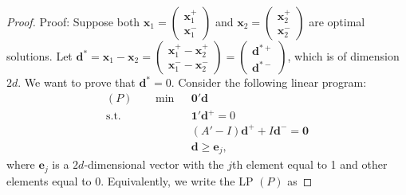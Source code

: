 \documentclass[final,11pt,3p]{article}\usepackage{setspace}
\begin{document}
\begin{proof}{Proof:}
Suppose both $\boldsymbol{x}_1=\begin{pmatrix}\boldsymbol{x}_1^+\\\boldsymbol{x}_1^-\end{pmatrix}$ and $\boldsymbol{x}_2=\begin{pmatrix}\boldsymbol{x}_2^+\\\boldsymbol{x}_2^-\end{pmatrix}$ are optimal solutions. Let $\boldsymbol{d}^* = \boldsymbol{x}_1 - \boldsymbol{x}_2 = \begin{pmatrix}\boldsymbol{x}_1^+ - \boldsymbol{x}_2^+\\\boldsymbol{x}_1^- - \boldsymbol{x}_2^-\end{pmatrix}=\begin{pmatrix}\boldsymbol{d}^{*+}\\\boldsymbol{d}^{*-}\end{pmatrix}$, which is of dimension $2d$. We want to prove that $\boldsymbol{d}^* = 0$. Consider the following linear program:
\begin{align*}
(P)~~~~~~~~  \min ~~      &\boldsymbol{0}'\boldsymbol{d}      \\
\text{s.t.}~~ & \boldsymbol{1}'\boldsymbol{d}^+ = 0\\
& (A' - I) \boldsymbol{d}^+ + I \boldsymbol{d}^- = \boldsymbol{0} \\
& \boldsymbol{d} \ge \boldsymbol{e}_j,
\end{align*}
where $\boldsymbol{e}_j$ is a $2d$-dimensional vector with the $j$th element equal to 1 and other elements equal to 0. Equivalently, we write the LP $(P)$ as


\end{proof}
\end{document}
